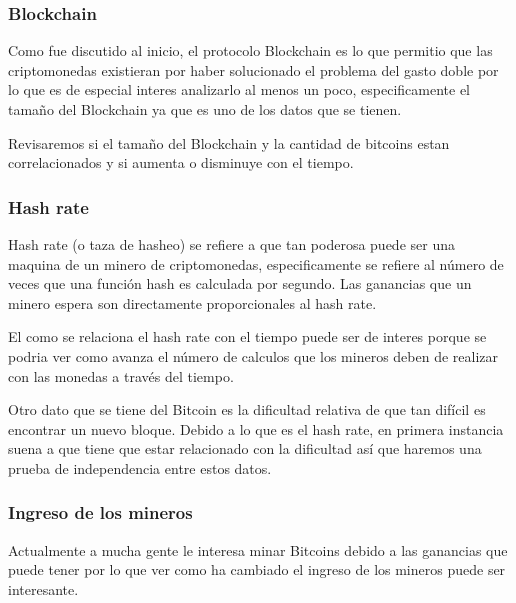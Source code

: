 \documentclass[12pt,letterpaper]{article}
\begin{document}

    \subsubsection*{Blockchain}

    Como fue discutido al inicio, el protocolo Blockchain es lo que permitio que las criptomonedas existieran por haber solucionado el problema del gasto doble por lo que es de especial interes analizarlo al menos un poco, especificamente el tamaño del Blockchain ya que es uno de los datos que se tienen.

    Revisaremos si el tamaño del Blockchain y la cantidad de bitcoins estan correlacionados y si aumenta o disminuye con el tiempo.


    \subsubsection*{Hash rate}

    Hash rate (o taza de hasheo) se refiere a que tan poderosa puede ser una maquina de un minero de criptomonedas, especificamente se refiere al número de veces que una función hash es calculada por segundo. Las ganancias que un minero espera son directamente proporcionales al hash rate.

    El como se relaciona el hash rate con el tiempo puede ser de interes porque se podria ver como avanza el número de calculos que los mineros deben de realizar con las monedas a través del tiempo.



   Otro dato que se tiene del Bitcoin es la dificultad relativa de que tan difícil es encontrar un nuevo bloque. Debido a lo que es el hash rate, en primera instancia suena a que tiene que estar relacionado con la dificultad así que haremos una prueba de independencia entre estos datos. 

   \subsubsection*{Ingreso de los mineros}

    Actualmente a mucha gente le interesa minar Bitcoins debido a las ganancias que puede tener por lo que ver como ha cambiado el ingreso de los mineros puede ser interesante.
\end{document}
